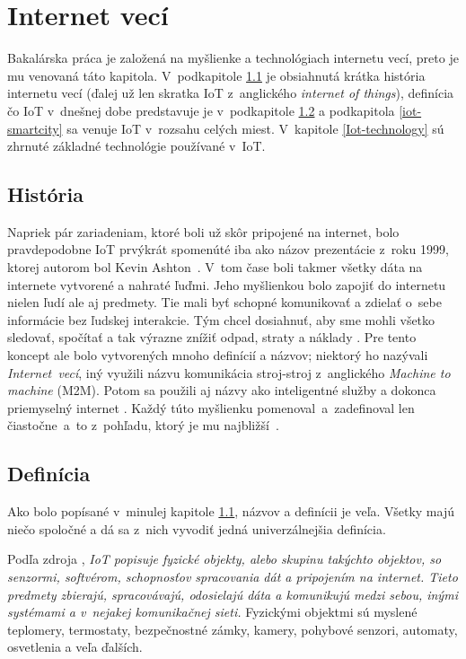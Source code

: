 \chapter{Internet vecí}\label{Internet_veci}
Bakalárska práca je založená na myšlienke a technológiach internetu vecí, preto je mu venovaná táto kapitola. 
V~podkapitole \ref{iot-history} je obsiahnutá krátka história internetu vecí (ďalej už len skratka IoT z~anglického \emph{internet of things}), definícia čo IoT v~dnešnej dobe predstavuje je v~podkapitole \ref{iot-definition} a podkapitola \ref{iot-smartcity} sa venuje IoT v~rozsahu celých miest. 
V~kapitole \ref{Iot-technology} sú zhrnuté základné technológie používané v~IoT.

\section{História}\label{iot-history}
Napriek pár zariadeniam, ktoré boli už skôr pripojené na internet, bolo pravdepodobne IoT prvýkrát spomenúté iba ako názov prezentácie z~roku 1999, ktorej autorom bol Kevin Ashton~\cite{ashton2009internet}. 
V~tom čase boli takmer všetky dáta na internete vytvorené a nahraté ľuďmi. 
Jeho myšlienkou bolo zapojiť do internetu nielen ľudí ale aj predmety. 
Tie mali byť schopné komunikovať a zdielať o~sebe informácie bez ľudskej interakcie. 
Tým chcel dosiahnuť, aby sme mohli všetko sledovať, spočítať a tak výrazne znížiť odpad, straty a náklady \cite{ashton2009internet,patel2016internet,IoT-History}. 
Pre tento koncept ale bolo vytvorených mnoho definícií a názvov; niektorý ho nazývali \emph{Internet~vecí}, iný využili názvu komunikácia stroj-stroj z~anglického \emph{Machine to machine} (M2M). 
Potom sa použili aj názvy ako inteligentné služby a dokonca priemyselný internet \cite{10.5555/2785661}.
Každý túto myšlienku pomenoval~a~zadefinoval len čiastočne~a~to z~pohľadu, ktorý je mu najbližší~\cite{kellmereit2013silent}.



\section{Definícia}\label{iot-definition}
Ako bolo popísané v~minulej kapitole \ref{iot-history}, názvov a definícii je veľa. Všetky majú niečo spoločné a dá sa z~nich vyvodiť jedná univerzálnejšia definícia.

Podľa zdroja \cite{keramidas2016components}, \textit{IoT popisuje fyzické objekty, alebo skupinu takýchto objektov, so senzormi, softvérom, schopnosťov spracovania dát a pripojením na internet. 
Tieto predmety zbierajú, spracovávajú, odosielajú dáta a komunikujú medzi sebou, inými systémami a v~nejakej komunikačnej sieti.} 
Fyzickými objektmi sú myslené teplomery, termostaty, bezpečnostné zámky, kamery, pohybové senzori, automaty, osvetlenia a veľa ďalších. 

